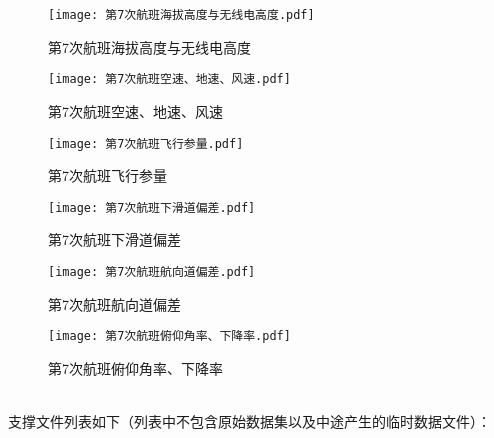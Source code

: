 \documentclass{MathorCupModeling}
\begin{document}
	\begin{figure}[H]
		\centering
		\begin{minipage}{0.48\linewidth}
			\centering
			\texttt{[image: 第7次航班海拔高度与无线电高度.pdf]}
			\caption{第7次航班海拔高度与无线电高度}
			\label{fig:第7次航班海拔高度与无线电高度}
		\end{minipage}
		\begin{minipage}{0.48\linewidth}
			\centering
			\texttt{[image: 第7次航班空速、地速、风速.pdf]}
			\caption{第7次航班空速、地速、风速}
			\label{fig:第7次航班空速、地速、风速}
		\end{minipage}
	\end{figure}
	\begin{figure}[H]
		\centering
		\begin{minipage}{0.48\linewidth}
			\centering
			\texttt{[image: 第7次航班飞行参量.pdf]}
			\caption{第7次航班飞行参量}
			\label{fig:第7次航班飞行参量}
		\end{minipage}
		\begin{minipage}{0.48\linewidth}
			\centering
			\texttt{[image: 第7次航班下滑道偏差.pdf]}
			\caption{第7次航班下滑道偏差}
			\label{fig:第7次航班下滑道偏差}
		\end{minipage}
	\end{figure}
	\begin{figure}[H]
		\centering
		\begin{minipage}{0.48\linewidth}
			\centering
			\texttt{[image: 第7次航班航向道偏差.pdf]}
			\caption{第7次航班航向道偏差}
			\label{fig:第7次航班航向道偏差}
		\end{minipage}
		\begin{minipage}{0.48\linewidth}
			\centering
			\texttt{[image: 第7次航班俯仰角率、下降率.pdf]}
			\caption{第7次航班俯仰角率、下降率}
			\label{fig:第7次航班俯仰角率、下降率}
		\end{minipage}
	\end{figure}
\newpage
	~\\

	支撑文件列表如下（列表中不包含原始数据集以及中途产生的临时数据文件）：
\end{document}
